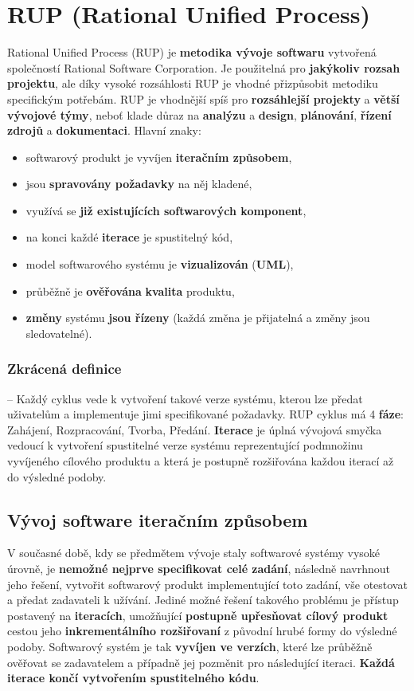 \section{RUP (Rational Unified Process)}
Rational Unified Process (RUP) je \textbf{metodika vývoje softwaru} vytvořená společností Rational Software Corporation. Je použitelná pro \textbf{jakýkoliv rozsah projektu}, ale díky vysoké rozsáhlosti RUP je vhodné přizpůsobit metodiku specifickým potřebám. RUP je vhodnější spíš pro \textbf{rozsáhlejší projekty} a \textbf{větší vývojové týmy}, neboť klade důraz na \textbf{analýzu} a \textbf{design}, \textbf{plánování}, \textbf{řízení zdrojů} a \textbf{dokumentaci}. Hlavní znaky:

\begin{itemize}
    \item softwarový produkt je vyvíjen \textbf{iteračním způsobem},
    \item jsou \textbf{spravovány požadavky} na něj kladené,
    \item využívá se \textbf{již existujících softwarových komponent},
    \item na konci každé \textbf{iterace} je spustitelný kód,
    \item model softwarového systému je \textbf{vizualizován} (\textbf{UML}),
    \item průběžně je \textbf{ověřována} \textbf{kvalita} produktu,
    \item \textbf{změny} systému\textbf{ jsou řízeny} (každá změna je přijatelná a změny jsou sledovatelné).
\end{itemize}

\subsubsection*{Zkrácená definice} -- Každý cyklus vede k vytvoření takové verze systému, kterou lze předat uživatelům a implementuje jimi specifikované požadavky. RUP cyklus má 4 \textbf{fáze}: Zahájení, Rozpracování, Tvorba, Předání. \textbf{Iterace} je úplná vývojová smyčka vedoucí k vytvoření spustitelné verze systému reprezentující podmnožinu vyvíjeného cílového produktu a která je postupně rozšiřována každou iterací až do výsledné podoby.

\subsection{Vývoj software iteračním způsobem}
V současné době, kdy se předmětem vývoje staly softwarové systémy vysoké úrovně, je \textbf{nemožné nejprve specifikovat celé zadání}, následně navrhnout jeho řešení, vytvořit softwarový produkt implementující toto zadání, vše otestovat a předat zadavateli k užívání. Jediné možné řešení takového problému je přístup postavený na \textbf{iteracích}, umožňující \textbf{postupně upřesňovat cílový produkt} cestou jeho \textbf{inkrementálního rozšiřovaní} z původní hrubé formy do výsledné podoby.  Softwarový systém je tak \textbf{vyvíjen ve verzích}, které lze průběžně ověřovat se zadavatelem a případně jej pozměnit pro následující iteraci. \textbf{Každá iterace končí vytvořením spustitelného kódu}.

